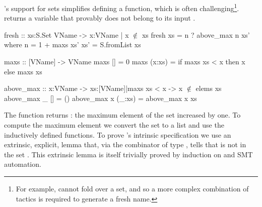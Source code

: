 \begin{fullversion}
%
\lh's support for sets simplifies
defining a  function,
which is often challenging\footnote{For example, \coq cannot fold over a set,
and so a more complex combination of tactics is
required to generate a fresh name.}.
%
 returns a variable that provably
does not belong to its input .
%
\begin{mcode}
  fresh :: xs:S.Set VName -> { x:VName | x $\not\in$ xs }
  fresh xs = n ? above_max n xs'
    where n    = 1 + maxs xs'
          xs'  = S.fromList xs

  maxs :: [VName] -> VName
  maxs []     = 0
  maxs (x:xs) = if maxs xs < x then x else maxs xs

  above_max :: x:VName -> xs:{[VName]|maxs xs < x} -> {x $\not\in$ elems xs}
  above_max _ []     = ()
  above_max x (_:xs) = above_max x xs
\end{mcode}
%
The  function returns : the maximum element of the set
increased by one.
%
To compute the maximum element we convert the set to a list
and use the inductively defined  functions.
To prove 's intrinsic specification we use
an extrinsic, \ie explicit, lemma 
that, via the  combinator of type ,
tells \lh that  is not in the set .
%
This extrinsic lemma is itself trivially proved
by induction on  and SMT automation.
\end{fullversion}

